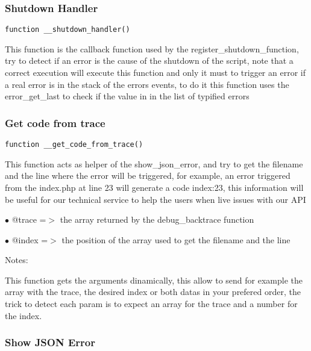 \documentclass[a4paper]{article}
\begin{document}
\subsubsection{Shutdown Handler}

\begin{lstlisting}
function __shutdown_handler()
\end{lstlisting}

This function is the callback function used by the register\_shutdown\_function, try to
detect if an error is the cause of the shutdown of the script, note that a correct
execution will execute this function and only it must to trigger an error if a real
error is in the stack of the errors events, to do it this function uses the error\_get\_last
to check if the value in in the list of typified errors

\hypertarget{toc117}{}
\subsubsection{Get code from trace}

\begin{lstlisting}
function __get_code_from_trace()
\end{lstlisting}

This function acts as helper of the show\_json\_error, and try to get the filename and the line
where the error will be triggered, for example, an error triggered from the index.php at line
23 will generate a code index:23, this information will be useful for our technical service
to help the users when live issues with our API

\begin{compactitem}
\item[\color{myblue}$\bullet$] @trace =$>$ the array returned by the debug\_backtrace function
\item[\color{myblue}$\bullet$] @index =$>$ the position of the array used to get the filename and the line
\end{compactitem}

Notes:

This function gets the arguments dinamically, this allow to send for example the array with
the trace, the desired index or both datas in your prefered order, the trick to detect each
param is to expect an array for the trace and a number for the index.

\hypertarget{toc118}{}
\subsubsection{Show JSON Error}
\end{document}
